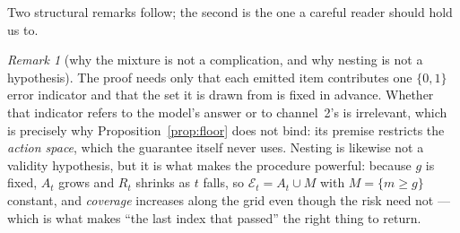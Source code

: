 \documentclass[review,number,doubleblind]{elsarticle}
\theoremstyle{plain}
\theoremstyle{definition}
\theoremstyle{remark}
\newtheorem{remark}{Remark}
\newcommand{\emit}{\mathcal{E}}
\begin{document}
Two structural remarks follow; the second is the one a careful reader should hold us to.

\begin{remark}[why the mixture is not a complication, and why nesting is not a hypothesis]
The proof needs only that each emitted item contributes one $\{0,1\}$ error indicator and that
the set it is drawn from is fixed in advance. Whether that indicator refers to the model's
answer or to channel~2's is irrelevant, which is precisely why Proposition~\ref{prop:floor}
does not bind: its premise restricts the \emph{action space}, which the guarantee itself never
uses. Nesting is likewise not a validity hypothesis, but it is what makes the procedure
powerful: because $g$ is fixed, $A_t$ grows and $R_t$ shrinks as $t$ falls, so
$\emit_t=A_t\cup M$ with $M=\{m\ge g\}$ constant, and \emph{coverage} increases along the grid
even though the risk need not --- which is what makes ``the last index that passed'' the right
thing to return.
\end{remark}
\end{document}

